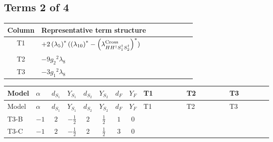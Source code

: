 \documentclass[8pt]{article}
\begin{document}
\begin{landscape}
\subsection*{Terms 2 of 4}
\begin{center}
\begin{tabular}{@{}c >{\raggedright\arraybackslash}p{0.82\linewidth}@{}}
\toprule
Column & Representative term structure \\
\midrule
T1 & \(\displaystyle +2 \left({\lambda_5}\right)^{*} (\left({\lambda_{10}}\right)^{*}-\left({\lambda_{H H^\dagger S_1^\dagger S_2^\dagger}^{\rm Cross}}\right)^{*})\) \\
\midrule
T2 & \(\displaystyle -9 {g_2}^2 {\lambda_8}\) \\
\midrule
T3 & \(\displaystyle -3 {g_1}^2 {\lambda_8}\) \\
\midrule
\bottomrule
\end{tabular}
\end{center}
\smallskip
\tiny
\begin{longtable}{@{}llcccccc >{\raggedright\arraybackslash}p{0.21\linewidth} >{\raggedright\arraybackslash}p{0.21\linewidth} >{\raggedright\arraybackslash}p{0.21\linewidth}@{}}
\toprule
Model & $\alpha$ & $d_{S_1}$ & $Y_{S_1}$ & $d_{S_2}$ & $Y_{S_2}$ & $d_F$ & $Y_F$ & T1 & T2 & T3 \\
\midrule
\endfirsthead
\toprule
Model & $\alpha$ & $d_{S_1}$ & $Y_{S_1}$ & $d_{S_2}$ & $Y_{S_2}$ & $d_F$ & $Y_F$ & T1 & T2 & T3 \\
\midrule
\endhead
T3-B & $-1$ & $2$ & $-\frac{1}{2}$ & $2$ & $\frac{1}{2}$ & $1$ & $0$ & \scriptsize\adjustbox{max width=\linewidth}{$\begin{gathered} +2 \left({\lambda_5}\right)^{*} (\left({\lambda_{10}}\right)^{*}-\left({\lambda_{H H^\dagger S_1^\dagger S_2^\dagger}^{\rm Cross}}\right)^{*})\end{gathered}$} & \scriptsize\adjustbox{max width=\linewidth}{$\begin{gathered} -9 {g_2}^2 {\lambda_8}\end{gathered}$} & \scriptsize\adjustbox{max width=\linewidth}{$\begin{gathered} -3 {g_1}^2 {\lambda_8}\end{gathered}$} \\
\midrule
T3-C & $-1$ & $2$ & $-\frac{1}{2}$ & $2$ & $\frac{1}{2}$ & $3$ & $0$ & \scriptsize\adjustbox{max width=\linewidth}{$\begin{gathered} +2 \left({\lambda_5}\right)^{*} (\left({\lambda_{10}}\right)^{*}-\left({\lambda_{H H^\dagger S_1^\dagger S_2^\dagger}^{\rm Cross}}\right)^{*})\end{gathered}$} & \scriptsize\adjustbox{max width=\linewidth}{$\begin{gathered} -9 {g_2}^2 {\lambda_8}\end{gathered}$} & \scriptsize\adjustbox{max width=\linewidth}{$\begin{gathered} -3 {g_1}^2 {\lambda_8}\end{gathered}$} \\

\end{longtable}
\end{landscape}
\end{document}
